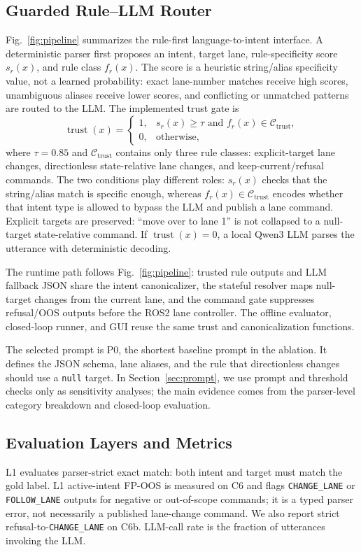 \documentclass[conference]{IEEEtran}
\begin{document}
\subsection{Guarded Rule--LLM Router}
Fig.~\ref{fig:pipeline} summarizes the rule-first language-to-intent interface. A deterministic parser first proposes an intent, target lane, rule-specificity score $s_r(x)$, and rule class $f_r(x)$. The score is a heuristic string/alias specificity value, not a learned probability: exact lane-number matches receive high scores, unambiguous aliases receive lower scores, and conflicting or unmatched patterns are routed to the LLM. The implemented trust gate is
\begin{equation}
\operatorname{trust}(x)=
\begin{cases}
1, & s_r(x)\geq\tau \text{ and } f_r(x)\in\mathcal{C}_{\mathrm{trust}},\\
0, & \text{otherwise},
\end{cases}
\end{equation}
where $\tau=0.85$ and $\mathcal{C}_{\mathrm{trust}}$ contains only three rule classes: explicit-target lane changes, directionless state-relative lane changes, and keep-current/refusal commands. The two conditions play different roles: $s_r(x)$ checks that the string/alias match is specific enough, whereas $f_r(x)\in\mathcal{C}_{\mathrm{trust}}$ encodes whether that intent type is allowed to bypass the LLM and publish a lane command. Explicit targets are preserved: ``move over to lane 1'' is not collapsed to a null-target state-relative command. If $\operatorname{trust}(x)=0$, a local Qwen3 LLM parses the utterance with deterministic decoding.

The runtime path follows Fig.~\ref{fig:pipeline}: trusted rule outputs and LLM fallback JSON share the intent canonicalizer, the stateful resolver maps null-target changes from the current lane, and the command gate suppresses refusal/OOS outputs before the ROS2 lane controller. The offline evaluator, closed-loop runner, and GUI reuse the same trust and canonicalization functions.

The selected prompt is P0, the shortest baseline prompt in the ablation. It defines the JSON schema, lane aliases, and the rule that directionless changes should use a \texttt{null} target. In Section~\ref{sec:prompt}, we use prompt and threshold checks only as sensitivity analyses; the main evidence comes from the parser-level category breakdown and closed-loop evaluation.

\subsection{Evaluation Layers and Metrics}
L1 evaluates parser-strict exact match: both intent and target must match the gold label. L1 active-intent FP-OOS is measured on C6 and flags \texttt{CHANGE\_LANE} or \texttt{FOLLOW\_LANE} outputs for negative or out-of-scope commands; it is a typed parser error, not necessarily a published lane-change command. We also report strict refusal-to-\texttt{CHANGE\_LANE} on C6b. LLM-call rate is the fraction of utterances invoking the LLM.
\end{document}

